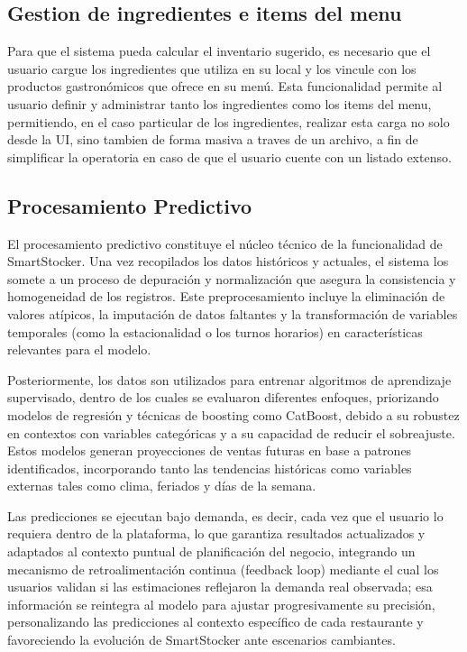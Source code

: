 \subsection{Gestion de ingredientes e items del menu}\label{sec:carga-datos}

Para que el sistema pueda calcular el inventario sugerido, es necesario que el usuario cargue los ingredientes que utiliza en su local y los vincule con los productos gastronómicos que ofrece en su menú. Esta funcionalidad permite al usuario definir y administrar tanto los ingredientes como los items del menu, permitiendo, en el caso particular de los ingredientes, realizar esta carga no solo desde la UI, sino tambien de forma masiva a traves de un archivo, a fin de simplificar la operatoria en caso de que el usuario cuente con un listado extenso.

\subsection{Procesamiento Predictivo}\label{sec:procesamiento-predictivo}

El procesamiento predictivo constituye el núcleo técnico de la funcionalidad de SmartStocker. Una vez recopilados los datos históricos y actuales, el sistema los somete a un proceso de depuración y normalización que asegura la consistencia y homogeneidad de los registros. Este preprocesamiento incluye la eliminación de valores atípicos, la imputación de datos faltantes y la transformación de variables temporales (como la estacionalidad o los turnos horarios) en características relevantes para el modelo.

Posteriormente, los datos son utilizados para entrenar algoritmos de aprendizaje supervisado, dentro de los cuales se evaluaron diferentes enfoques, priorizando modelos de regresión y técnicas de boosting como CatBoost, debido a su robustez en contextos con variables categóricas y a su capacidad de reducir el sobreajuste. Estos modelos generan proyecciones de ventas futuras en base a patrones identificados, incorporando tanto las tendencias históricas como variables externas tales como clima, feriados y días de la semana.

Las predicciones se ejecutan bajo demanda, es decir, cada vez que el usuario lo requiera dentro de la plataforma, lo que garantiza resultados actualizados y adaptados al contexto puntual de planificación del negocio, integrando un mecanismo de retroalimentación continua (feedback loop) mediante el cual los usuarios validan si las estimaciones reflejaron la demanda real observada; esa información se reintegra al modelo para ajustar progresivamente su precisión, personalizando las predicciones al contexto específico de cada restaurante y favoreciendo la evolución de SmartStocker ante escenarios cambiantes.

